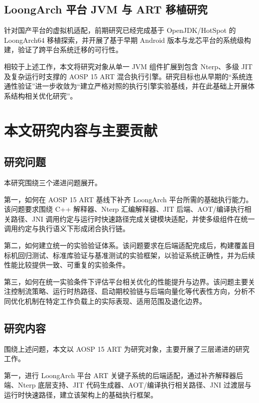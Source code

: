 \subsection{LoongArch 平台 JVM 与 ART 移植研究}

针对国产平台的虚拟机适配，前期研究已经完成基于 OpenJDK/HotSpot 的 LoongArch64 移植探索\citep{Huang2021}，并开展了基于早期 Android 版本与龙芯平台的系统级构建\citep{Du2020Loongson2KAndroid, Lei2012AndroidLoongson}，验证了跨平台系统迁移的可行性。

相较于上述工作，本文将研究对象从单一 JVM 组件扩展到包含 Nterp、多级 JIT 及复杂运行时支撑的 AOSP 15 ART 混合执行引擎。研究目标也从早期的“系统连通性验证”进一步收敛为“建立严格对照的执行引擎实验基线，并在此基础上开展体系结构相关优化研究”。

\section{本文研究内容与主要贡献}

\subsection{研究问题}

本研究围绕三个递进问题展开。

第一，如何在 AOSP 15 ART 基线下补齐 LoongArch 平台所需的基础执行能力。该问题要求围绕 C++ 解释器、Nterp 汇编解释器、JIT 后端、AOT/编译执行相关路径、JNI 调用约定与运行时快速路径完成关键模块适配，并使多级组件在统一调用约定与执行语义下形成闭合执行链。

第二，如何建立统一的实验验证体系。该问题要求在后端适配完成后，构建覆盖目标机回归测试、标准库验证与基准测试的实验框架，以验证系统正确性，并为后续性能比较提供一致、可重复的实验条件。

第三，如何在统一实验条件下评估平台相关优化的性能提升与边界。该问题主要关注控制流策略、运行时热路径、启动期校验链与后端向量化等代表性方向，分析不同优化机制在特定工作负载上的实际表现、适用范围及退化边界。

\subsection{研究内容}

围绕上述问题，本文以 AOSP 15 ART 为研究对象，主要开展了三层递进的研究工作。

第一，进行 LoongArch 平台 ART 关键子系统的后端适配，通过补齐解释器后端、Nterp 底层支持、JIT 代码生成器、AOT/编译执行相关路径、JNI 过渡层与运行时快速路径，建立该架构上的基础执行框架。

